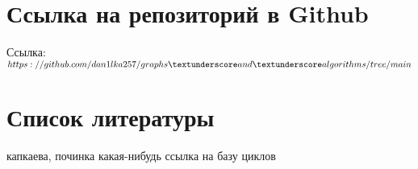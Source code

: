 	\section{Ссылка на репозиторий в Github}
	Ссылка: $https://github.com/dan1lka257/graphs \textunderscore and \textunderscore algorithms/tree/main$
	\section{Список литературы}
	капкаева, починка
	какая-нибудь ссылка на базу циклов
